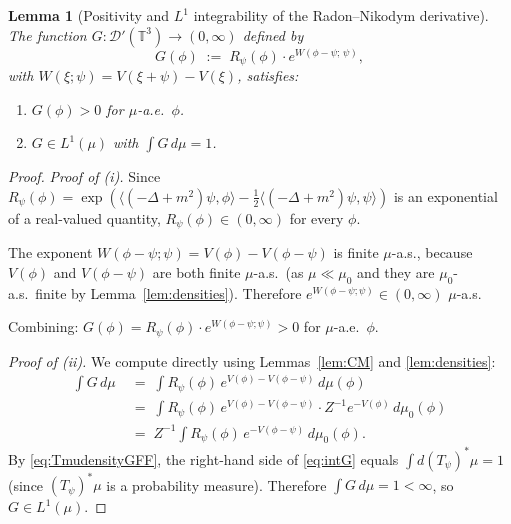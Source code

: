 \documentclass[12pt]{article}
\newtheorem{lemma}[theorem]{Lemma}
\theoremstyle{definition}
\begin{document}
\begin{lemma}[Positivity and $L^1$ integrability of the Radon--Nikodym derivative]
\label{lem:RN}
The function $G:\mathcal{D}'(\mathbb{T}^3)\to(0,\infty)$ defined by
\[
  G(\phi) \;:=\; R_\psi(\phi)\cdot e^{W(\phi-\psi;\,\psi)},
  \label{eq:Gdef}
\]
with $W(\xi;\psi) = V(\xi+\psi)-V(\xi)$, satisfies:
\begin{enumerate}
  \item[(i)] $G(\phi) > 0$ for $\mu$-a.e.\ $\phi$.
  \item[(ii)] $G \in L^1(\mu)$ with $\int G\,d\mu = 1$.
\end{enumerate}
\end{lemma}

\begin{proof}
\textit{Proof of (i).}
Since $R_\psi(\phi) = \exp(\langle(-\Delta+m^2)\psi,\phi\rangle - \frac{1}{2}\langle(-\Delta+m^2)\psi,\psi\rangle)$
is an exponential of a real-valued quantity, $R_\psi(\phi)\in(0,\infty)$ for every $\phi$.

The exponent $W(\phi-\psi;\psi) = V(\phi) - V(\phi-\psi)$ is finite $\mu$-a.s., because
$V(\phi)$ and $V(\phi-\psi)$ are both finite $\mu$-a.s.\ (as $\mu\ll\mu_0$ and they are
$\mu_0$-a.s.\ finite by Lemma~\ref{lem:densities}).  Therefore $e^{W(\phi-\psi;\psi)}\in(0,\infty)$
$\mu$-a.s.

Combining: $G(\phi) = R_\psi(\phi)\cdot e^{W(\phi-\psi;\psi)} > 0$ for $\mu$-a.e.\ $\phi$.

\textit{Proof of (ii).}
We compute directly using Lemmas~\ref{lem:CM} and \ref{lem:densities}:
\begin{align}
  \int G\,d\mu
  &\;=\; \int R_\psi(\phi)\, e^{V(\phi)-V(\phi-\psi)}\,d\mu(\phi) \nonumber \\
  &\;=\; \int R_\psi(\phi)\, e^{V(\phi)-V(\phi-\psi)}\cdot Z^{-1}e^{-V(\phi)}\,d\mu_0(\phi) \nonumber \\
  &\;=\; Z^{-1}\int R_\psi(\phi)\, e^{-V(\phi-\psi)}\,d\mu_0(\phi).
  \label{eq:intG}
\end{align}
By \eqref{eq:TmudensityGFF}, the right-hand side of \eqref{eq:intG} equals
$\int d(T_\psi)^*\mu = 1$ (since $(T_\psi)^*\mu$ is a probability measure).
Therefore $\int G\,d\mu = 1 < \infty$, so $G\in L^1(\mu)$.
\end{proof}
\end{document}
